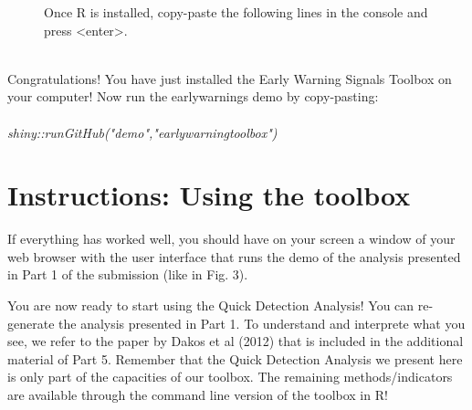 \documentclass[12pt,a4paper,final]{article}
\begin{document}
\begin{doublespacing}
\begin{figure}[ht]
\begin{center}
\caption{Once R is installed, copy-paste the following lines in the console and press <enter>.}
\end{center}
\end{figure}
\\
Congratulations! You have just installed the Early Warning Signals Toolbox on your computer! Now run the earlywarnings demo by copy-pasting:\\
\\
\textit{shiny::runGitHub("demo","earlywarningtoolbox")}

\section{Instructions: Using the toolbox}
If everything has worked well, you should have on your screen a window of your web browser with the user interface that runs the demo of the analysis presented in Part 1 of the submission (like in Fig. 3).%


You are now ready to start using the Quick Detection Analysis! You can re-generate the analysis presented in Part 1. To understand and interprete what you see, we refer to the paper by Dakos et al (2012) that is included in the additional material of Part 5. Remember that the Quick Detection Analysis we present here is only part of the capacities of our toolbox. The remaining methods/indicators are available through the command line version of the toolbox in R!


\end{doublespacing}
\end{document}
